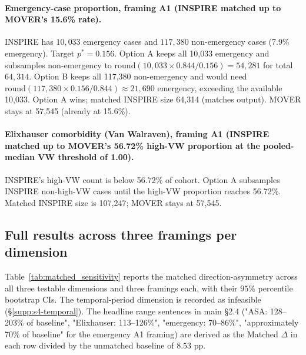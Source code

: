 \documentclass[11pt,a4paper]{article}
\begin{document}
\paragraph{Emergency-case proportion, framing A1 (INSPIRE matched up to
MOVER's 15.6\% rate).}
INSPIRE has $10{,}033$ emergency cases and $117{,}380$ non-emergency cases
(7.9\% emergency). Target $p^* = 0.156$. Option A keeps all 10{,}033 emergency
and subsamples non-emergency to $\mathrm{round}(10{,}033 \times 0.844 / 0.156)
= 54{,}281$ for total $64{,}314$. Option B keeps all 117{,}380 non-emergency
and would need $\mathrm{round}(117{,}380 \times 0.156/0.844) \approx 21{,}690$
emergency, exceeding the available 10{,}033. Option A wins; matched INSPIRE
size 64{,}314 (matches output). MOVER stays at 57{,}545 (already at 15.6\%).

\paragraph{Elixhauser comorbidity (Van Walraven), framing A1 (INSPIRE matched
up to MOVER's 56.72\% high-VW proportion at the pooled-median VW threshold of
1.00).}
INSPIRE's high-VW count is below 56.72\% of cohort. Option A subsamples
INSPIRE non-high-VW cases until the high-VW proportion reaches 56.72\%.
Matched INSPIRE size is 107{,}247; MOVER stays at 57{,}545.

\subsection{Full results across three framings per dimension}\label{supp:s4-results}

Table~\ref{tab:matched_sensitivity} reports the matched direction-asymmetry
across all three testable dimensions and three framings each, with their
$95\%$ percentile bootstrap CIs. The temporal-period dimension is recorded
as infeasible (\S\ref{supp:s4-temporal}). The headline range sentences in
main \S2.4 ("ASA: 128--203\% of baseline", "Elixhauser: 113--126\%",
"emergency: 70--86\%", "approximately 70\% of baseline" for the emergency A1
framing) are derived as the Matched $\Delta$ in each row divided by the
unmatched baseline of $8.53$ pp.
\end{document}
